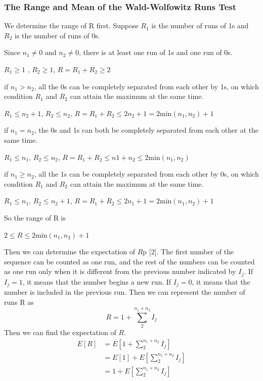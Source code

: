 \documentclass[a4paper,12pt]{article}
\begin{document}
\subsubsection{The Range and Mean of the Wald-Wolfowitz Runs Test}
\noindent We determine the range of R first. Suppose $R_1$ is the number of runs of 1s and $R_2$ is the number of runs of 0s.

\noindent Since  $n_1\neq 0$ and $n_2\neq 0$, there is at least one run of 1s and one run of 0s.
\begin{center}
$R_1\geq 1$ , $R_2\geq 1$, $R=R_1+R_2\geq 2$
\end{center}

\noindent if $n_1>n_2$, all the 0s can be completely separated from each other by 1s, on which condition $R_1$ and $R_2$ can attain the maximum at the same time.
\begin{center}
$R_1\leq n_2+1$, $R_2\leq n_2$, $R=R_1+R_2\leq 2n_2+1=2$min$(n_1,n_2)+1$
\end{center}
\noindent if $n_1=n_2$, the 0s and 1s can both be completely separated from each other at the same time.
\begin{center}
$R_1\leq n_1$, $R_2\leq n_2$, $R=R_1+R_2\leq n1+n_2\leq 2$min$(n_1,n_2)$
\end{center}
\noindent if $n_1\geq n_2$, all the 1s can be completely separated from each other by 0s, on which condition $R_1$ and $R_2$ can attain the maximum at the same time.
\begin{center}
$R_1\leq n_1$, $R_2\leq n_2+1$, $R=R_1+R_2\leq 2n_1+1=2$min$(n_1,n_2)+1$
\end{center}
\noindent So the range of R is
\begin{center}
$2\leq R\leq 2$min$(n_1,n_2)+1$
\end{center}
Then we can determine the expectation of $R$p [2]. The first number of the sequence can be counted as one run, and the rest of the numbers can be counted as one run only when it is different from the previous number indicated by $I_j$. If $I_j=1$, it means that the number begins a new run. If $I_j=0$, it means that the number is included in the previous run. Then we can represent the number of runs R as
\begin{equation}\label{3.2.1.1}
R=1+\sum_2^{n_1+n_2}I_j
\end{equation}
\noindent Then we can find the expectation of $R$.
\begin{equation}
\begin{split}
E[R]&=E[1+\sum_2^{n_1+n_2}I_j]\\
	&=E[1]+E[\sum_2^{n_1+n_2}I_j]\\
	&=1+E[\sum_2^{n_1+n_2}I_j]
\end{split}
\end{equation}
\end{document}

